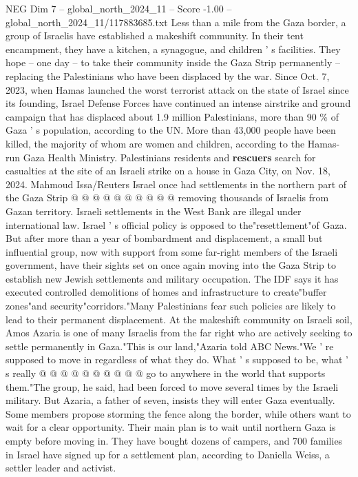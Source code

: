 \begin{textsample}{NEG Dim 7 – global\_north\_2024\_11 – Score -1.00 – global\_north\_2024\_11/117883685.txt}  \label{ex:f7_neg_338}
Less than a mile from the Gaza border, a group of Israelis have established a makeshift community.
In their tent encampment, they have a kitchen, a synagogue, and children ' s facilities.
They hope -- one day -- to take their community inside the Gaza Strip permanently -- replacing the Palestinians who have been displaced by the war.
Since Oct. 7, 2023, when Hamas launched the worst terrorist attack on the state of Israel since its founding, Israel Defense Forces have continued an intense airstrike and ground campaign that has displaced about 1.9 million Palestinians, more than 90 \% of Gaza ' s population, according to the UN.
More than 43,000 people have been killed, the majority of whom are women and children, according to the Hamas-run Gaza Health Ministry.
Palestinians residents and \textbf{rescuers} search for casualties at the site of an Israeli strike on a house in Gaza City, on Nov. 18, 2024.
Mahmoud Issa/Reuters Israel once had settlements in the northern part of the Gaza Strip @ @ @ @ @ @ @ @ @ @ removing thousands of Israelis from Gazan territory.
Israeli settlements in the West Bank are illegal under international law.
Israel ' s official policy is opposed to the"resettlement"of Gaza.
But after more than a year of bombardment and displacement, a small but influential group, now with support from some far-right members of the Israeli government, have their sights set on once again moving into the Gaza Strip to establish new Jewish settlements and military occupation.
The IDF says it has executed controlled demolitions of homes and infrastructure to create"buffer zones"and security"corridors."Many Palestinians fear such policies are likely to lead to their permanent displacement.
At the makeshift community on Israeli soil, Amos Azaria is one of many Israelis from the far right who are actively seeking to settle permanently in Gaza."This is our land,"Azaria told ABC News."We ' re supposed to move in regardless of what they do.
What ' s supposed to be, what ' s really @ @ @ @ @ @ @ @ @ @ go to anywhere in the world that supports them."The group, he said, had been forced to move several times by the Israeli military.
But Azaria, a father of seven, insists they will enter Gaza eventually.
Some members propose storming the fence along the border, while others want to wait for a clear opportunity.
Their main plan is to wait until northern Gaza is empty before moving in.
They have bought dozens of campers, and 700 families in Israel have signed up for a settlement plan, according to Daniella Weiss, a settler leader and activist.

\end{textsample}
